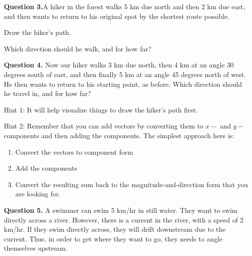 \documentclass[12pt]{article}
\begin{document}
\newpage
{\bf Question 3.}A hiker in the forest walks 5 km due north and then 2 km due east, and then wants to return to his original spot by the shortest route possible. 

Draw the hiker's path. 








\vspace{3in}

Which direction should he walk, and for how far?










\newpage
{\bf Question 4.} Now our hiker walks 3 km due north, then 4 km at an angle 30 degrees south of east, and then finally 5 km at an angle 45 degrees north of west. He then wants to return to his starting point, as before. Which direction should he travel in, and for how far? 

Hint 1: It will help visualize things to draw the hiker's path first.

Hint 2: Remember that you can add vectors by converting them to $x-$ and $y-$components and then adding the components. The simplest approach here is:

\begin{enumerate}
	\item Convert the vectors to component form
	\item Add the components
	\item Convert the resulting sum back to the magnitude-and-direction form that you are looking for.
\end{enumerate}

\newpage
{\bf Question 5.} A swimmer can swim 5 km/hr in still water. They want to swim directly across a river. However, there is a current in the river, with a speed of 2 km/hr. If they swim directly across, they will drift downstream due to the current. Thus, in order to get where they want to go, they needs to angle themselves upstream.
\end{document}
